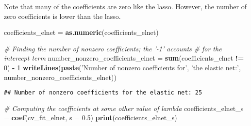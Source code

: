 \documentclass[
]{book}
\newenvironment{Shaded}{\begin{snugshade}}{\end{snugshade}}
\newcommand{\CommentTok}[1]{\textcolor[rgb]{0.56,0.35,0.01}{\textit{#1}}}
\newcommand{\DataTypeTok}[1]{\textcolor[rgb]{0.13,0.29,0.53}{#1}}
\newcommand{\DecValTok}[1]{\textcolor[rgb]{0.00,0.00,0.81}{#1}}
\newcommand{\FloatTok}[1]{\textcolor[rgb]{0.00,0.00,0.81}{#1}}
\newcommand{\KeywordTok}[1]{\textcolor[rgb]{0.13,0.29,0.53}{\textbf{#1}}}
\newcommand{\NormalTok}[1]{#1}
\newcommand{\OperatorTok}[1]{\textcolor[rgb]{0.81,0.36,0.00}{\textbf{#1}}}
\newcommand{\StringTok}[1]{\textcolor[rgb]{0.31,0.60,0.02}{#1}}
\begin{document}
Note that many of the coefficients are zero like the lasso. However, the number of zero coefficients is lower than the lasso.

\begin{Shaded}
\begin{Highlighting}[]
\NormalTok{coefficients_elnet =}\StringTok{ }\KeywordTok{as.numeric}\NormalTok{(coefficients_elnet)}

\CommentTok{# Finding the number of nonzero coefficients; the '-1' accounts}
\CommentTok{# for the intercept term}
\NormalTok{number_nonzero_coefficients_elnet =}
\StringTok{  }\KeywordTok{sum}\NormalTok{(coefficients_elnet }\OperatorTok{!=}\StringTok{ }\DecValTok{0}\NormalTok{) }\OperatorTok{-}\StringTok{ }\DecValTok{1}
\KeywordTok{writeLines}\NormalTok{(}\KeywordTok{paste}\NormalTok{(}\StringTok{'Number of nonzero coefficients for'}\NormalTok{,}
                 \StringTok{'the elastic net:'}\NormalTok{,}
\NormalTok{                 number_nonzero_coefficients_elnet))}
\end{Highlighting}
\end{Shaded}

\begin{verbatim}
## Number of nonzero coefficients for the elastic net: 25
\end{verbatim}

\begin{Shaded}
\begin{Highlighting}[]
\CommentTok{# Computing the coefficients at some other value of lambda}
\NormalTok{coefficients_elnet_s =}\StringTok{ }\KeywordTok{coef}\NormalTok{(cv_fit_elnet, }\DataTypeTok{s =} \FloatTok{0.5}\NormalTok{)}
\KeywordTok{print}\NormalTok{(coefficients_elnet_s)}
\end{Highlighting}
\end{Shaded}
\end{document}
